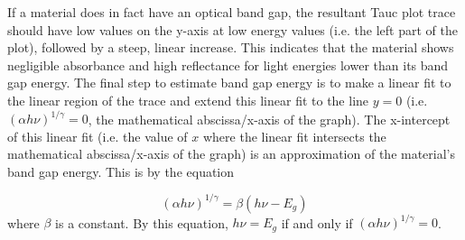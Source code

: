 \documentclass[letterpaper, 12pt]{article}
\begin{document}
If a material does in fact have an optical band gap, the resultant Tauc plot trace should have low values on the y-axis at low energy values (i.e. the left part of the plot), followed by a steep, linear increase. This indicates that the material shows negligible absorbance and high reflectance for light energies lower than its band gap energy. The final step to estimate band gap energy is to make a linear fit to the linear region of the trace and extend this linear fit to the line $y = 0$ (i.e. $(\alpha h \nu)^{1/\gamma} = 0$, the mathematical abscissa/x-axis of the graph). The x-intercept of this linear fit (i.e. the value of $x$ where the linear fit intersects the mathematical abscissa/x-axis of the graph) is an approximation of the material's band gap energy. This is by the equation

%
\begin{equation*}
(\alpha h \nu)^{1/\gamma} = \beta(h \nu - E_g)
\end{equation*}
%
where $\beta$ is a constant.  By this equation, $h \nu = E_g$ if and only if $(\alpha h \nu)^{1/\gamma} = 0$.
\end{document}
